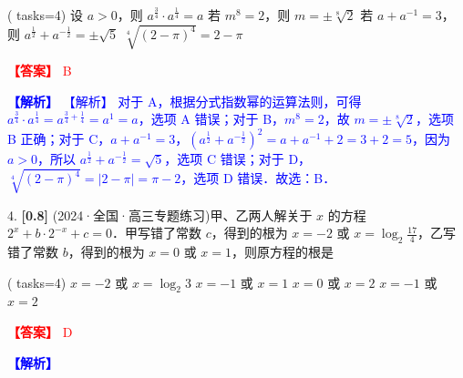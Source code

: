 \documentclass[11pt,a4paper]{article}
\begin{document}
\begin{tasks}( tasks=4)
    \task 设 $a>0$，则 $a^{\frac{3}{4}} \cdot a^{\frac{1}{4}}=a$
    \task 若 $m^{8}=2$，则 $m=\pm \sqrt[8]{2}$
    \task 若 $a+a^{-1}=3$，则 $a^{\frac{1}{2}}+a^{-\frac{1}{2}}=\pm \sqrt{5}$
    \task $\sqrt[4]{(2-\pi)^{4}}=2-\pi$
\end{tasks}

\par\noindent\textcolor{red}{\textbf{【答案】} B}
\par\noindent\textcolor{blue}{\textbf{【解析】} 【解析】 对于 A，根据分式指数幂的运算法则，可得 $a^{\frac{3}{4}} \cdot a^{\frac{1}{4}}=a^{\frac{3}{4}+\frac{1}{4}}=a^{1}=a$，选项 A 错误；对于 B，$m^{8}=2$，故 $m=\pm \sqrt[8]{2}$，选项 B 正确；对于 C，$a+a^{-1}=3$，$\left(a^{\frac{1}{2}}+a^{-\frac{1}{2}}\right)^{2}=a+a^{-1}+2=3+2=5$，因为 $a>0$，所以 $a^{\frac{1}{2}}+a^{-\frac{1}{2}}=\sqrt{5}$，选项 C 错误；对于 D，$\sqrt[4]{(2-\pi)^{4}}=|2-\pi|=\pi-2$，选项 D 错误．故选：B．}

\vspace{0.5cm}

4. \textbf{[0.8]} (2024·全国·高三专题练习)甲、乙两人解关于 $x$ 的方程 $2^{x}+b \cdot 2^{-x}+c=0$．甲写错了常数 $c$，得到的根为 $x=-2$ 或 $x=\log _{2} \frac{17}{4}$，乙写错了常数 $b$，得到的根为 $x=0$ 或 $x=1$，则原方程的根是

\begin{tasks}( tasks=4)
    \task $x=-2$ 或 $x=\log _{2} 3$
    \task $x=-1$ 或 $x=1$
    \task $x=0$ 或 $x=2$
    \task $x=-1$ 或 $x=2$
\end{tasks}

\par\noindent\textcolor{red}{\textbf{【答案】} D}
\par\noindent\textcolor{blue}{\textbf{【解析】} }

\vspace{0.5cm}
\end{document}
